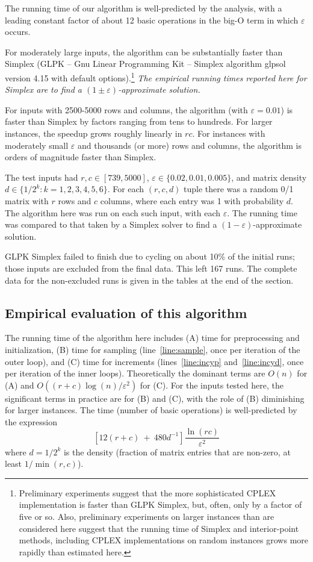 \documentclass[11pt]{svjour3} \usepackage{fullpage}
\newcommand{\eps}{\varepsilon}
\newcommand{\rows}{r}
\newcommand{\columns}{c}
\begin{document}
The running time of our algorithm is well-predicted by the analysis, with a leading constant factor of about 12 basic operations in the big-O term in which $\eps$ occurs.

For moderately large inputs, the algorithm can be substantially faster than Simplex (GLPK -- Gnu Linear Programming Kit -- Simplex algorithm glpsol version 4.15 with default options).\footnote{Preliminary experiments suggest that the more sophisticated CPLEX implementation
is faster than GLPK Simplex, but, often, only by a factor of five or so.
Also, preliminary experiments on larger instances than are considered here
suggest that the running time of Simplex and interior-point methods, including CPLEX implementations on random instances grows more rapidly than estimated here.
}
{\em The empirical running times reported here for Simplex are to find a $(1\pm\eps)$-approximate solution.}  

For inputs with 2500-5000 rows and columns, the algorithm (with $\eps=0.01$) is faster than Simplex by factors ranging from tens to hundreds.
For larger instances, the speedup grows roughly linearly in $\rows\columns$.
For instances with moderately small $\eps$ 
and thousands (or more) rows and columns,
the algorithm is orders of magnitude faster than Simplex.

The test inputs had
$r,c \in [739,5000]$,
$\eps\in \{0.02,0.01,0.005\}$,
and matrix density $d\in\{1/2^k : k = 1,2,3,4,5,6\}$.
For each $(r,c,d)$ tuple 
there was a random 0/1 matrix with $r$ rows and $c$ columns,
where each entry was 1 with probability $d$.
The algorithm here was run on each such input, with each $\eps$.
The running time was compared to that taken by a Simplex solver
to find a $(1-\eps)$-approximate solution.

GLPK Simplex failed to finish due to cycling on about 10\% of the initial runs; 
those inputs are excluded from the final data.
This left 167 runs.
The complete data for the non-excluded runs is given in the tables at the end of the section.

\subsection{Empirical evaluation of this algorithm}

The running time of  the algorithm here includes
(A) time for preprocessing and initialization,
(B) time for sampling (line~\ref{line:sample}, once per iteration of the outer loop),
and (C) time for increments (lines~\ref{line:incyp} and~\ref{line:incyd}, once per iteration of the inner loops).
Theoretically the dominant terms are $O(n)$ for (A) and $O((r+c)\log(n)/\eps^2)$ for (C).
For the inputs tested here, the significant terms in practice are for (B) and (C),
with the role of (B) diminishing for larger instances.
The time (number of basic operations) is well-predicted by the expression
\begin{equation}\label{eqn:predtime}
[12(r+c) ~+~ 480 d^{-1}]\frac{\ln(rc)}{\eps^2}
\end{equation}
where $d=1/2^k$ is the density (fraction of matrix entries that are non-zero, at least $1/\min(r,c)$).
\end{document}

